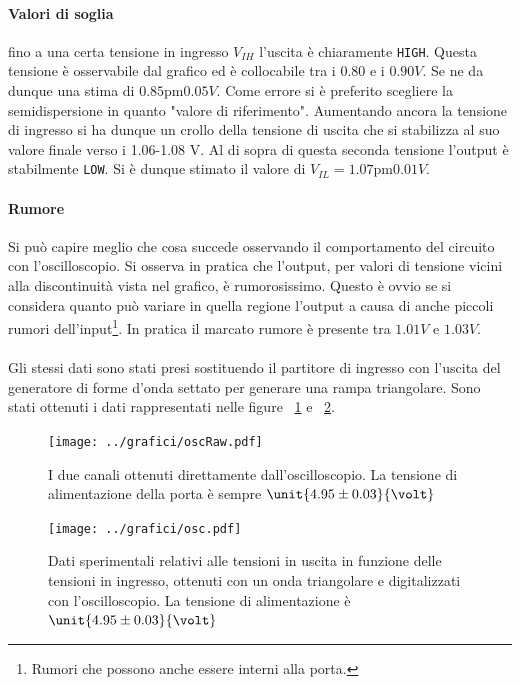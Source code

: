\documentclass[a4paper,10pt]{article}
\def\code#1{\texttt{#1}}
\begin{document}
\paragraph{Valori di soglia} fino a una certa tensione in ingresso $V_{IH}$ l'uscita è chiaramente \code{HIGH}. Questa tensione è osservabile dal grafico ed è collocabile tra i $\unit{0.80\text{ e i }0.90}{V}$. Se ne da dunque una stima di $\unit{0.85 \pm 0.05}{V}$. Come errore si è preferito scegliere la semidispersione in quanto "valore di riferimento". 
Aumentando ancora la tensione di ingresso si ha dunque un crollo della tensione di uscita che si stabilizza al suo valore finale verso i 1.06-1.08 V. Al di sopra di questa seconda tensione l'output è stabilmente \code{LOW}. Si è dunque stimato il valore di $V_{IL}=\unit{1.07 \pm 0.01}{V}$. 


\paragraph{Rumore} Si può capire meglio che cosa succede osservando il comportamento del circuito con l'oscilloscopio. Si osserva in pratica che l'output, per valori di tensione vicini alla discontinuità vista nel grafico, è rumorosissimo. Questo è ovvio se si considera quanto può variare in quella regione l'output a causa di anche piccoli rumori dell'input\footnote{Rumori che possono anche essere interni alla porta.}.
In pratica il marcato rumore è presente tra $\unit{1.01}{V}$ e $\unit{1.03}{V}$.


\paragraph{}Gli stessi dati sono stati presi sostituendo il partitore di ingresso con l'uscita del generatore di forme d'onda settato per generare una rampa triangolare.
Sono stati ottenuti i dati rappresentati nelle figure \figurename{~\ref{fig:oscRaw}} e \figurename{~\ref{fig:osc}}.

\begin{figure}[H]
	\centering
	\texttt{[image: ../grafici/oscRaw.pdf]}
	\caption{I due canali ottenuti direttamente dall'oscilloscopio. La tensione di alimentazione della porta è sempre $ \unit{4.95 \pm 0.03}{\volt}$}
	\label{fig:oscRaw}
\end{figure}



\begin{figure}[H]
	\centering
	\texttt{[image: ../grafici/osc.pdf]}
	\caption{Dati sperimentali relativi alle tensioni in uscita in funzione delle tensioni in ingresso, ottenuti con un onda triangolare e digitalizzati con l'oscilloscopio. La tensione di alimentazione è $ \unit{4.95 \pm 0.03}{\volt}$}
	\label{fig:osc}
\end{figure}
\end{document}

